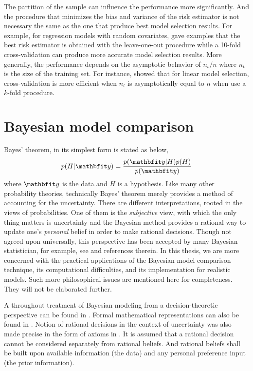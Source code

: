 The partition of the sample can influence the performance more significantly.
And the procedure that minimizes the bias and variance of the risk estimator
is not necessary the same as the one that produce best model selection
results.  For example, for regression models with random covariates,
\cite{Breiman:1992vx} gave examples that the best risk estimator is obtained
with the leave-one-out procedure while a 10-fold cross-validation can produce
more accurate model selection results. More generally, the performance depends
on the asymptotic behavior of $n_t/n$ where $n_t$ is the size of the training
set. For instance, \cite{Shao:1997vx} showed that for linear model selection,
cross-validation is more efficient when $n_t$ is asymptotically equal to $n$
when use a $k$-fold procedure.

\section{Bayesian model comparison}
\label{sec:Bayesian model comparison}

Bayes' theorem, in its simplest form is stated as below,
\begin{equation}
  p(H|\data) = \frac{p(\data|H)p(H)}{p(\data)} \label{eq:bayes}
\end{equation}
where $\data$ is the data and $H$ is a hypothesis. Like many other probability
theories, technically Bayes' theorem merely provides a method of accounting
for the uncertainty. There are different interpretations, rooted in the views
of probabilities. One of them is the \emph{subjective} view, with which the
only thing matters is uncertainty and the Bayesian method provides a rational
way to update one's \emph{personal} belief in order to make rational
decisions. Though not agreed upon universally, this perspective has been
accepted by many Bayesian statistician, for example, see
\cite[][chap.~1]{Bernardo:1994vd} and references therein. In this thesis, we
are more concerned with the practical applications of the Bayesian model
comparison technique, its computational difficulties, and its implementation
for realistic models. Such more philosophical issues are mentioned here for
completeness. They will not be elaborated further.

A throughout treatment of Bayesian modeling from a decision-theoretic
perspective can be found in \cite{Robert:2007tc}. Formal mathematical
representations can also be found in \cite[][sec.~5.1 and
sec.~6.1]{Bernardo:1994vd}. Notion of rational decisions in the context of
uncertainty was also made precise in the form of axioms in
\cite{DeFinetti:1974tg,DeFinetti:1975ua}. It is assumed that a rational
decision cannot be considered separately from rational beliefs. And rational
beliefs shall be built upon available information (the data) and any personal
preference input (the prior information).

